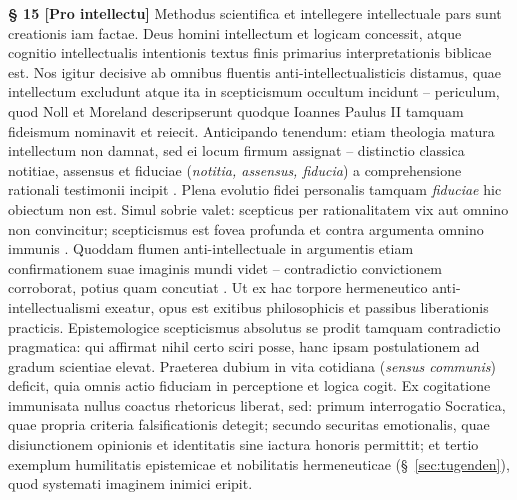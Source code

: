 \documentclass[11pt,a4paper]{article}
\makeatletter
\newcommand{\apthsec}[3]{%
  \phantomsection%
  \def\@currentlabel{#1}%
  \label{sec:#3}%
  \textbf{§ #1 [#2]}%
}
\makeatother
\begin{document}
\apthsec{15}{Pro intellectu}{kategorial} Methodus scientifica et intellegere intellectuale pars sunt creationis iam factae. Deus homini intellectum et logicam concessit, atque cognitio intellectualis intentionis textus finis primarius interpretationis biblicae est. Nos igitur decisive ab omnibus fluentis anti-intellectualisticis distamus, quae intellectum excludunt atque ita in scepticismum occultum incidunt -- periculum, quod Noll \citeyearpar{noll1994} et Moreland \citeyearpar{moreland1997} descripserunt quodque Ioannes Paulus II \citeyearpar{fidesetratio1998} tamquam fideismum nominavit et reiecit. Anticipando tenendum: etiam theologia matura intellectum non damnat, sed ei locum firmum assignat -- distinctio classica notitiae, assensus et fiduciae (\textit{notitia, assensus, fiducia}) a comprehensione rationali testimonii incipit \citep{calvin1559}. Plena evolutio fidei personalis tamquam \textit{fiduciae} hic obiectum non est. Simul sobrie valet: scepticus per rationalitatem vix aut omnino non convincitur; scepticismus est fovea profunda et contra argumenta omnino immunis \citep{wittgenstein1969}. Quoddam flumen anti-intellectuale in argumentis etiam confirmationem suae imaginis mundi videt -- contradictio convictionem corroborat, potius quam concutiat \citep{festinger1956,noll1994}. Ut ex hac torpore hermeneutico anti-intellectualismi exeatur, opus est exitibus philosophicis et passibus liberationis practicis. Epistemologice scepticismus absolutus se prodit tamquam contradictio pragmatica: qui affirmat nihil certo sciri posse, hanc ipsam postulationem ad gradum scientiae elevat. Praeterea dubium in vita cotidiana (\textit{sensus communis}) deficit, quia omnis actio fiduciam in perceptione et logica cogit. Ex cogitatione immunisata nullus coactus rhetoricus liberat, sed: primum interrogatio Socratica, quae propria criteria falsificationis detegit; secundo securitas emotionalis, quae disiunctionem opinionis et identitatis sine iactura honoris permittit; et tertio exemplum humilitatis epistemicae et nobilitatis hermeneuticae (§~\ref{sec:tugenden}), quod systemati imaginem inimici eripit.
\end{document}
